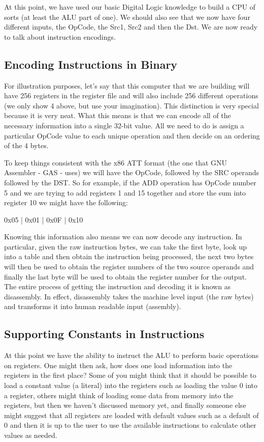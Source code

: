 At this point, we have used our basic Digital Logic knowledge to build a CPU of sorts (at least the ALU part of one). We should also see that we now have four different inputs, the OpCode, the Src1, Src2 and then the Dst. We are now ready to talk about instruction encodings.

\subsection{Encoding Instructions in Binary}

For illustration purposes, let’s say that this computer that we are building will have 256 registers in the register file and will also include 256 different operations (we only show 4 above, but use your imagination). This distinction is very special because it is very neat. What this means is that we can encode all of the necessary information into a single 32-bit value. All we need to do is assign a particular OpCode value to each unique operation and then decide on an ordering of the 4 bytes.

To keep things consistent with the x86 ATT format (the one that GNU Assembler - GAS - uses) we will have the OpCode, followed by the SRC operands followed by the DST. So for example, if the ADD operation has OpCode number 5 and we are trying to add registers 1 and 15 together and store the sum into register 10 we might have the following: 

0x05 | 0x01 | 0x0F | 0x10

Knowing this information also means we can now decode any instruction. In particular, given the raw instruction bytes, we can take the first byte, look up into a table and then obtain the instruction being processed, the next two bytes will then be used to obtain the register numbers of the two source operands and finally the last byte will be used to obtain the register number for the output. The entire process of getting the instruction and decoding it is known as disassembly. In effect, disassembly takes the machine level input (the raw bytes) and transforms it into human readable input (assembly).

\subsection{Supporting Constants in Instructions}

At this point we have the ability to instruct the ALU to perform basic operations on registers. One might then ask, how does one load information into the registers in the first place? Some of you might think that it should be possible to load a constant value (a literal) into the registers such as loading the value 0 into a register, others might think of loading some data from memory into the registers, but then we haven't discussed memory yet, and finally someone else might suggest that all registers are loaded with default values such as a default of 0 and then it is up to the user to use the available instructions to calculate other values as needed. 

